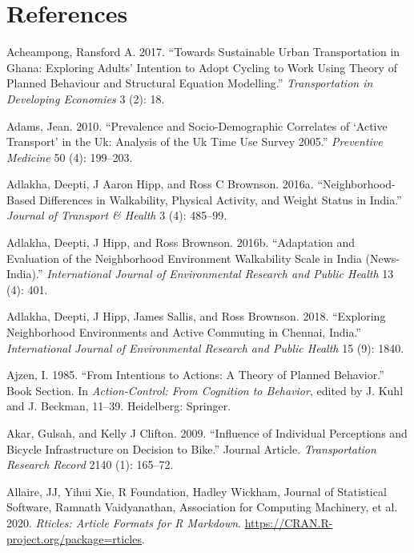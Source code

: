 \documentclass[]{elsarticle} %
\begin{document}
\hypertarget{references}{%
\section*{References}\label{references}}

\hypertarget{refs}{}
\leavevmode\hypertarget{ref-acheampong2017towards}{}%
Acheampong, Ransford A. 2017. ``Towards Sustainable Urban Transportation
in Ghana: Exploring Adults' Intention to Adopt Cycling to Work Using
Theory of Planned Behaviour and Structural Equation Modelling.''
\emph{Transportation in Developing Economies} 3 (2): 18.

\leavevmode\hypertarget{ref-adams2010prevalence}{}%
Adams, Jean. 2010. ``Prevalence and Socio-Demographic Correlates of
`Active Transport' in the Uk: Analysis of the Uk Time Use Survey 2005.''
\emph{Preventive Medicine} 50 (4): 199--203.

\leavevmode\hypertarget{ref-adlakha2016neighborhood}{}%
Adlakha, Deepti, J Aaron Hipp, and Ross C Brownson. 2016a.
``Neighborhood-Based Differences in Walkability, Physical Activity, and
Weight Status in India.'' \emph{Journal of Transport \& Health} 3 (4):
485--99.

\leavevmode\hypertarget{ref-adlakha2016adaptation}{}%
Adlakha, Deepti, J Hipp, and Ross Brownson. 2016b. ``Adaptation and
Evaluation of the Neighborhood Environment Walkability Scale in India
(News-India).'' \emph{International Journal of Environmental Research
and Public Health} 13 (4): 401.

\leavevmode\hypertarget{ref-adlakha2018exploring}{}%
Adlakha, Deepti, J Hipp, James Sallis, and Ross Brownson. 2018.
``Exploring Neighborhood Environments and Active Commuting in Chennai,
India.'' \emph{International Journal of Environmental Research and
Public Health} 15 (9): 1840.

\leavevmode\hypertarget{ref-Ajzen1985intentions}{}%
Ajzen, I. 1985. ``From Intentions to Actions: A Theory of Planned
Behavior.'' Book Section. In \emph{Action-Control: From Cognition to
Behavior}, edited by J. Kuhl and J. Beckman, 11--39. Heidelberg:
Springer.

\leavevmode\hypertarget{ref-Akar2009influence}{}%
Akar, Gulsah, and Kelly J Clifton. 2009. ``Influence of Individual
Perceptions and Bicycle Infrastructure on Decision to Bike.'' Journal
Article. \emph{Transportation Research Record} 2140 (1): 165--72.

\leavevmode\hypertarget{ref-Allaire2020rticles}{}%
Allaire, JJ, Yihui Xie, R Foundation, Hadley Wickham, Journal of
Statistical Software, Ramnath Vaidyanathan, Association for Computing
Machinery, et al. 2020. \emph{Rticles: Article Formats for R Markdown}.
\url{https://CRAN.R-project.org/package=rticles}.
\end{document}
